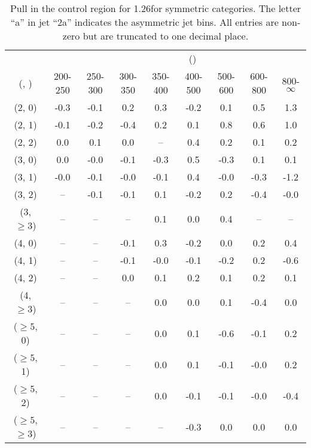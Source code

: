 \begin{table}[h!]
\tiny
\centering
\caption{Pull in the \mj control region for 1.26\ifb for symmetric categories. The letter ``a'' in jet \eg ``2a''  indicates the asymmetric jet bins. All entries are non-zero but are truncated to one decimal place.\label{tab:pullsep_mu_ewk_sym}}
\begin{tabular}
{ccccccccc}
	\hline\hline
&	& \multicolumn{8}{c}{\scalht (\gev)} \\ 
	 (\njet,  \nb) & 200-250 & 250-300 & 300-350 & 350-400 & 400-500 & 500-600 & 600-800 & 800-$\infty$ \\ [0.8ex] 
\hline
	(2, 0) & -0.3 & -0.1 & 0.2 & 0.3 & -0.2 & 0.1 & 0.5 & 1.3 \\[0.5ex] 
	(2, 1) & -0.1 & -0.2 & -0.4 & 0.2 & 0.1 & 0.8 & 0.6 & 1.0 \\[0.5ex] 
	(2, 2) & 0.0 & 0.1 & 0.0 & -- & 0.4 & 0.2 & 0.1 & 0.2 \\[0.5ex] 
	(3, 0) & 0.0 & -0.0 & -0.1 & -0.3 & 0.5 & -0.3 & 0.1 & 0.1 \\[0.5ex] 
	(3, 1) & -0.0 & -0.1 & -0.0 & -0.1 & 0.4 & -0.0 & -0.3 & -1.2 \\[0.5ex] 
	(3, 2) & -- & -0.1 & -0.1 & 0.1 & -0.2 & 0.2 & -0.4 & -0.0 \\[0.5ex] 
	(3, $\ge3$) & -- & -- & -- & 0.1 & 0.0 & 0.4 & -- & -- \\[0.5ex] 
	(4, 0) & -- & -- & -0.1 & 0.3 & -0.2 & 0.0 & 0.2 & 0.4 \\[0.5ex] 
	(4, 1) & -- & -- & -0.1 & -0.0 & -0.1 & -0.2 & 0.2 & -0.6 \\[0.5ex] 
	(4, 2) & -- & -- & 0.0 & 0.1 & 0.2 & 0.1 & 0.2 & 0.1 \\[0.5ex] 
	(4, $\ge3$) & -- & -- & -- & 0.0 & 0.0 & 0.1 & -0.4 & 0.0 \\[0.5ex] 
	($\ge5$, 0) & -- & -- & -- & 0.0 & 0.1 & -0.6 & -0.1 & 0.2 \\[0.5ex] 
	($\ge5$, 1) & -- & -- & -- & 0.0 & 0.1 & -0.1 & -0.0 & 0.2 \\[0.5ex] 
	($\ge5$, 2) & -- & -- & -- & 0.0 & -0.1 & -0.1 & -0.0 & -0.4 \\[0.5ex] 
	($\ge5$, $\ge3$) & -- & -- & -- & -- & -0.3 & 0.0 & 0.0 & 0.0 \\[0.5ex] 
	\hline
	\hline
\end{tabular}
\end{table}

